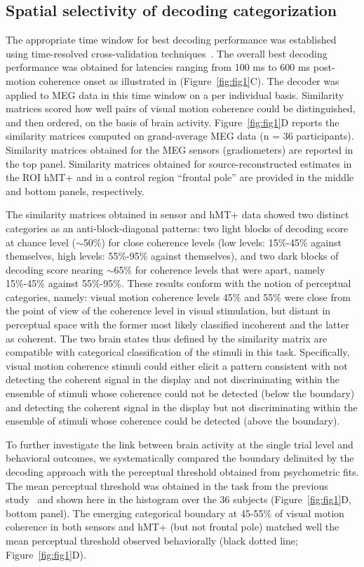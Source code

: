 \subsection*{Spatial selectivity of decoding categorization}
The appropriate time window for best decoding performance was established using time-resolved cross-validation techniques~\cite{21ramkumar2013feature}. The overall best decoding performance was obtained for latencies ranging from 100 ms to 600 ms post-motion coherence onset as illustrated in (Figure~\ref{fig:fig1}C). The decoder was applied to MEG data in this time window on a per individual basis. Similarity matrices scored how well pairs of visual motion coherence could be distinguished, and then ordered, on the basis of brain activity. Figure~\ref{fig:fig1}D reports the similarity matrices computed on grand-average MEG data (n = 36 participants). Similarity matrices obtained for the MEG sensors (gradiometers) are reported in the top panel. Similarity matrices obtained for source-reconstructed estimates in the ROI hMT+ and in a control region “frontal pole” are provided in the middle and bottom panels, respectively. 

The similarity matrices obtained in sensor and hMT+ data showed two distinct categories as an anti-block-diagonal patterns: two light blocks of decoding score at chance level ($\sim$50\%) for close coherence levels (low levels: 15\%-45\% against themselves, high levels: 55\%-95\% against themselves), and two dark blocks of decoding score nearing $\sim$65\% for coherence levels that were apart, namely 15\%-45\% against 55\%-95\%. These results conform with the notion of perceptual categories, namely: visual motion coherence levels 45\% and 55\% were close from the point of view of the coherence level in visual stimulation, but distant in perceptual space with the former most likely classified incoherent and the latter as coherent. The two brain states thus defined by the similarity matrix are compatible with categorical classification of the stimuli in this task. Specifically, visual motion coherence stimuli could either elicit a pattern consistent with not detecting the coherent signal in the display and not discriminating within the ensemble of stimuli whose coherence could not be detected (below the boundary) and detecting the coherent signal in the display but not discriminating within the ensemble of stimuli whose coherence could be detected (above the boundary).

To further investigate the link between brain activity at the single trial level and  behavioral outcomes, we systematically compared the boundary delimited by the decoding approach with the perceptual threshold obtained from psychometric fits. The mean perceptual threshold was obtained in the task from the previous study~\cite{23zilber2014supramodal} and shown here in the histogram over the 36 subjects (Figure~\ref{fig:fig1}D, bottom panel). The emerging categorical boundary at 45-55\% of visual motion coherence in both sensors and hMT+ (but not frontal pole) matched well the mean perceptual threshold observed behaviorally (black dotted line; Figure~\ref{fig:fig1}D). 


